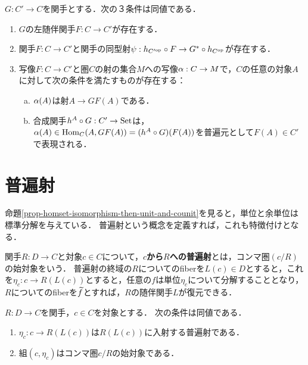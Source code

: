 \documentclass[uplatex,dvipdfmx]{jsreport}
\begin{document}
\begin{proposition}
    $G:C'\to C$を関手とする．次の３条件は同値である．
    \begin{enumerate}
        \item $G$の左随伴関手$F:C\to C'$が存在する．
        \item 関手$F:C\to C'$と関手の同型射$\psi:h_{C'^{\mathrm{op}}}\circ F\to G^*\circ h_{C^{\mathrm{op}}}$が存在する．
        \item 写像$F:C\to C'$と圏$C$の射の集合$M$への写像$\alpha:C\to M$で，$C$の任意の対象$A$に対して次の条件を満たすものが存在する：
        \begin{enumerate}[(a)]
            \item $\alpha(A)$は射$A\to GF(A)$である．
            \item 合成関手$h^A\circ G:C'\to\mathrm{Set}$は，$\alpha(A)\in\mathrm{Hom}_C(A,GF(A))=(h^A\circ G)(F(A))$を普遍元として$F(A)\in C'$で表現される．
        \end{enumerate}
    \end{enumerate}
\end{proposition}

\section{普遍射}

\begin{tcolorbox}[colframe=ForestGreen, colback=ForestGreen!10!white, breakable ,colbacktitle=ForestGreen!40!white, coltitle=black,fonttitle=\bfseries\sffamily,
    title=adjoint functors is an example of adjunction]
    命題\ref{prop-homset-isomorphism-then-unit-and-counit}を見ると，単位と余単位は標準分解を与えている．
    普遍射という概念を定義すれば，これも特徴付けとなる．
\end{tcolorbox}

\begin{definition}
    関手$R:D\to C$と対象$c\in C$について，\textbf{$c$から$R$への普遍射}とは，コンマ圏$(c/R)$の始対象をいう．
    普遍射の終域の$R$についてのfiberを$L(c)\in D$とすると，これを$\eta_c:c\to R(L(c))$とすると，任意の$f$は単位$\eta_c$について分解することとなり，$R$についてのfiberを$\widetilde{f}$とすれば，$R$の随伴関手$L$が復元できる．
\end{definition}

\begin{lemma}
    $R:D\to C$を関手，$c\in C$を対象とする．
    次の条件は同値である．
    \begin{enumerate}
        \item $\eta_c:c\to R(L(c))$は$R(L(c))$に入射する普遍射である．
        \item 組$(c,\eta_c)$はコンマ圏$c/R$の始対象である．
    \end{enumerate}
\end{lemma}
\end{document}
